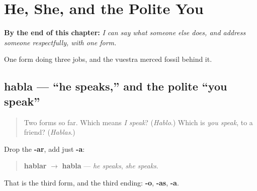 
\chapter{He, She, and the Polite You}
\label{ch:habla}

\begin{chapteropening}
\textbf{By the end of this chapter:} \emph{I can say what someone else does, and address someone respectfully, with one form.}

One form doing three jobs, and the vuestra merced fossil behind it.
\end{chapteropening}

\section[habla]{habla — \textquotedblleft{}he speaks,\textquotedblright{} and the polite \textquotedblleft{}you speak\textquotedblright{}}

\label{lesson:ES-C06-habla}



\begin{quote}
Two forms so far. Which means \emph{I speak}? (\emph{Hablo}.) Which is \emph{you speak}, to a friend? (\emph{Hablas}.)
\end{quote}

\begin{grammarlens}[title={Grammar Lens: take the -s away again}]
Drop the \textbf{-ar}, add just \textbf{-a}:

\begin{quote}
\textbf{hablar} $\to$ \textbf{habla} — \emph{he speaks}, \emph{she speaks}.
\end{quote}

That is the third form, and the third ending: \textbf{-o}, \textbf{-as}, \textbf{-a}.
\end{grammarlens}


